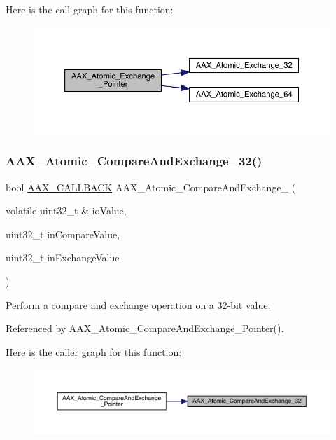 Here is the call graph for this function\+:
\nopagebreak
\begin{figure}[H]
\begin{center}
\leavevmode
\includegraphics[width=350pt]{a00398_a02803b3ea269d4ed4758a91eec9fa46c_cgraph}
\end{center}
\end{figure}
\mbox{\label{a00398_a74a2bdb895976193bdfe4cd2fe31e21e}} 
\subsubsection{\texorpdfstring{AAX\_Atomic\_CompareAndExchange\_32()}{AAX\_Atomic\_CompareAndExchange\_32()}}
{\footnotesize\ttfamily bool \mbox{\hyperlink{a00392_aaa22112139aa627574b1ef562f579d43}{A\+A\+X\+\_\+\+C\+A\+L\+L\+B\+A\+CK}} A\+A\+X\+\_\+\+Atomic\+\_\+\+Compare\+And\+Exchange\+\_ (\begin{DoxyParamCaption}\item[{volatile uint32\+\_\+t \&}]{io\+Value,  }\item[{uint32\+\_\+t}]{in\+Compare\+Value,  }\item[{uint32\+\_\+t}]{in\+Exchange\+Value }\end{DoxyParamCaption})}



Perform a compare and exchange operation on a 32-\/bit value. 



Referenced by A\+A\+X\+\_\+\+Atomic\+\_\+\+Compare\+And\+Exchange\+\_\+\+Pointer().

Here is the caller graph for this function\+:
\nopagebreak
\begin{figure}[H]
\begin{center}
\leavevmode
\includegraphics[width=350pt]{a00398_a74a2bdb895976193bdfe4cd2fe31e21e_icgraph}
\end{center}
\end{figure}
\mbox{\label{a00398_ae1e5b0cf8d8c7a301e13772a57a3d2fd}} 
